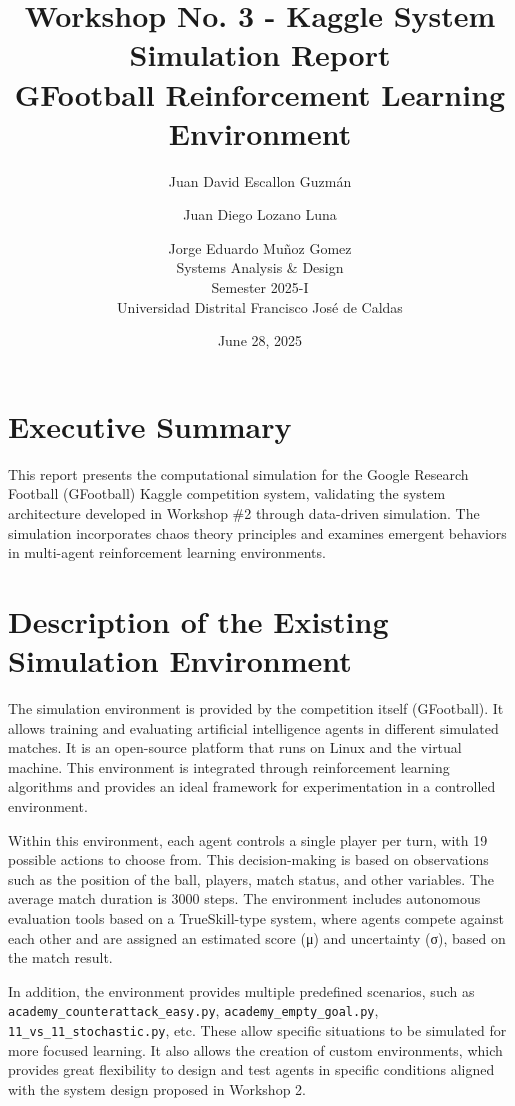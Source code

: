 \documentclass[12pt,a4paper]{article}
\title{Workshop No. 3 - Kaggle System Simulation Report\\
GFootball Reinforcement Learning Environment}
\author{Juan David Escallon Guzmán \and Juan Diego Lozano Luna \and Jorge Eduardo Muñoz Gomez \\
Systems Analysis \& Design\\
Semester 2025-I\\
Universidad Distrital Francisco José de Caldas}
\date{June 28, 2025}
\begin{document}
\maketitle

\tableofcontents
\newpage

\section{Executive Summary}

This report presents the computational simulation for the Google Research Football (GFootball) Kaggle competition system, validating the system architecture developed in Workshop \#2 through data-driven simulation. The simulation incorporates chaos theory principles and examines emergent behaviors in multi-agent reinforcement learning environments.

\section{Description of the Existing Simulation Environment}

The simulation environment is provided by the competition itself (GFootball). It allows training and evaluating artificial intelligence agents in different simulated matches. It is an open-source platform that runs on Linux and the virtual machine. This environment is integrated through reinforcement learning algorithms and provides an ideal framework for experimentation in a controlled environment.

Within this environment, each agent controls a single player per turn, with 19 possible actions to choose from. This decision-making is based on observations such as the position of the ball, players, match status, and other variables. The average match duration is 3000 steps. The environment includes autonomous evaluation tools based on a TrueSkill-type system, where agents compete against each other and are assigned an estimated score (μ) and uncertainty (σ), based on the match result.

In addition, the environment provides multiple predefined scenarios, such as \texttt{academy\_counterattack\_easy.py}, \texttt{academy\_empty\_goal.py}, \texttt{11\_vs\_11\_stochastic.py}, etc. These allow specific situations to be simulated for more focused learning. It also allows the creation of custom environments, which provides great flexibility to design and test agents in specific conditions aligned with the system design proposed in Workshop 2.
\end{document}
